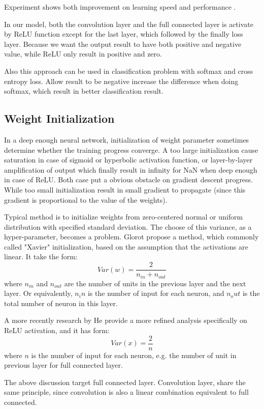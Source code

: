 \documentclass[10pt,twocolumn,letterpaper]{article}
\begin{document}
Experiment shows both improvement on learning speed and performance
\cite{krizhevsky2012imagenet, glorot2011deep}.

In our model, both the convolution layer and the full connected layer is activate by ReLU function
except for the last layer, which followed by the finally loss layer. Because we want the output
result to have both positive and negative value, while ReLU only result in positive and zero.

Also this approach can be used in classification problem with softmax and cross entropy loss.
Allow result to be negative increase the difference when doing softmax, which result in better
classification result.

\subsection{Weight Initialization}
In a deep enough neural network, initialization of weight parameter sometimes determine whether the
training progress converge. A too large initialization cause saturation in case of sigmoid or hyperbolic
activation function, or layer-by-layer amplification of output which finally result in
infinity for NaN when deep enough in case of ReLU. Both case put a obvious obstacle on gradient
descent progress. While too small initialization result in small gradient to propagate
(since this gradient is proportional to the value of the weights).

Typical method is to initialize weights from zero-centered normal or uniform distribution with specified
standard deviation. The choose of this variance, as a hyper-parameter, becomes a problem.
Glorot\cite{glorot2010understanding} propose a method, which commonly called "Xavier" initialization,
based on the assumption that the activations are linear. It take the form:
$$
Var(w) = \frac{2}{n_{in}+n_{out}}
$$
where $n_{in}$ and $n_{out}$ are the number of units in the previous layer and the next layer.
Or equivalently, $n_in$ is the number of input for each neuron, and $n_out$ is the total number of
neuron in this layer.

A more recently research by He\cite{he2015delving} provide a more refined analysis specifically
on ReLU activation, and it has form:
$$
Var(x) = \frac{2}{n}
$$
where $n$ is the number of input for each neuron, e.g. the number of unit in previous layer for
full connected layer.

The above discussion target full connected layer. Convolution layer, share the same principle,
since convolution is also a linear combination equivalent to full connected.
\end{document}
